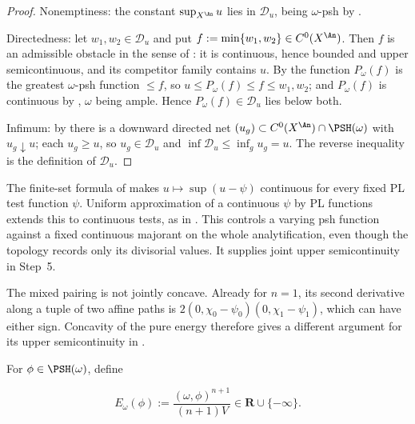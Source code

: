 \begin{proof}
Nonemptiness: the constant $\sup_{X^{\An}}u$ lies in $\mathcal D_u$, being
$\omega$-psh by .

Directedness: let $w_1,w_2\in\mathcal D_u$ and put
$f:=\min\{w_1,w_2\}\in C^0(X^{\An})$.  Then $f$ is an admissible
obstacle in the sense of : it is
continuous, hence bounded and upper semicontinuous, and its competitor
family contains $u$.  By  the function
$P_\omega(f)$ is the greatest $\omega$-psh function $\le f$, so
$u\le P_\omega(f)\le f\le w_1,w_2$; and $P_\omega(f)$ is continuous by
, $\omega$ being ample.  Hence
$P_\omega(f)\in\mathcal D_u$ lies below both.

Infimum: by  there is a downward
directed net $(u_g)\subset C^0(X^{\An})\cap\PSH(\omega)$ with
$u_g\downarrow u$; each $u_g\ge u$, so $u_g\in\mathcal D_u$ and
$\inf\mathcal D_u\le\inf_gu_g=u$.  The reverse inequality is the definition of
$\mathcal D_u$.
\end{proof}

\begin{remark}
\label{rem:ch46-usc-scope}
The finite-set formula of \cite[Lemma~4.26]{BJ22} makes
$u\mapsto\sup(u-\psi)$ continuous for every fixed PL test function
$\psi$. Uniform approximation of a continuous $\psi$ by PL functions
extends this to continuous tests, as in \cite[Proposition~4.28]{BJ22}.
This controls a varying psh function against a fixed continuous majorant
on the whole analytification, even though the topology records only
its divisorial values. It supplies joint upper semicontinuity in Step~5.

The mixed pairing is not jointly concave. Already for $n=1$, its second
derivative along a tuple of two affine paths is
$2(0,\chi_0-\psi_0)(0,\chi_1-\psi_1)$, which can have either sign. Concavity of the pure energy therefore gives a different argument
for its upper semicontinuity in .
\end{remark}

\begin{definition}
\label{def:bj-ma-energy}
For $\phi\in\PSH(\omega)$, define

\[
                   E_\omega(\phi)
       :=\frac{(\omega,\phi)^{n+1}}{(n+1)V}
       \in\mathbf R\cup\{-\infty\}.
\tag{46.13}\label{eq:bj-energy-definition}
\]
\end{definition}

